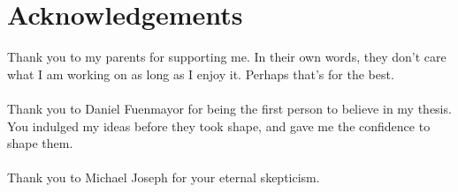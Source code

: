 \chapter*{Acknowledgements}
\noindent Thank you to my parents for supporting me. In their own words, they don't 
care what I am working on as long as I enjoy it. Perhaps that's for the best.
\\\\
Thank you to Daniel Fuenmayor for being the first person to believe in my 
thesis. 
You indulged my ideas before they took shape, and gave me the confidence to
shape them.
\\\\
Thank you to Michael Joseph for your eternal skepticism.
\clearpage